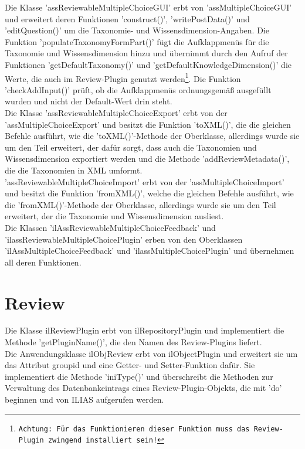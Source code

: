 \documentclass[a4paper]{scrreprt}
\begin{document}
Die Klasse 'assReviewableMultipleChoiceGUI' erbt von 'assMultipleChoiceGUI' und erweitert deren Funktionen '\textunderscore \textunderscore construct()', 'writePostData()' und 'editQuestion()' um die Taxonomie- und Wissensdimension-Angaben. 
Die Funktion 'populateTaxonomyFormPart()' fügt die Aufklappmenüs für die Taxonomie und Wissensdimension hinzu und übernimmt durch den Aufruf der Funktionen 'getDefaultTaxonomy()' und 'getDefaultKnowledgeDimension()' die Werte, die auch im Review-Plugin genutzt werden\footnote{\texttt{Achtung: Für das Funktionieren dieser Funktion muss das Review-Plugin zwingend installiert sein!}}. 
Die Funktion 'checkAddInput()' prüft, ob die Aufklappmenüs ordnungsgemäß ausgefüllt wurden und nicht der Default-Wert drin steht. \\

Die Klasse 'assReviewableMultipleChoiceExport' erbt von der 'assMultipleChoiceExport' und besitzt die Funktion 'toXML()', die die gleichen Befehle ausführt, wie die 'toXML()'-Methode der Oberklasse, allerdings wurde sie um den Teil erweitert, der dafür sorgt, dass auch die Taxonomien und Wissensdimension exportiert werden und die Methode 'addReviewMetadata()', die die Taxonomien in XML umformt.\\

'assReviewableMultipleChoiceImport' erbt von der 'assMultipleChoiceImport' und besitzt die Funktion 'fromXML()', welche die gleichen Befehle ausführt, wie die 'fromXML()'-Methode der Oberklasse, allerdings wurde sie um den Teil erweitert, der die Taxonomie und Wissensdimension ausliest.\\

Die Klassen 'ilAssReviewableMultipleChoiceFeedback' und 'ilassReviewableMultipleChoicePlugin' erben von den Oberklassen 'ilAssMultipleChoiceFeedback' und 'ilassMultipleChoicePlugin' und übernehmen all deren Funktionen.\\

\section{Review}

Die Klasse ilReviewPlugin erbt von ilRepositoryPlugin und implementiert die Methode 'getPluginName()', die den Namen des Review-Plugins liefert.\\

Die Anwendungsklasse ilObjReview erbt von ilObjectPlugin und erweitert sie um das Attribut group\textunderscore id und eine Getter- und Setter-Funktion dafür. 
Sie implementiert die Methode 'iniType()' und überschreibt die Methoden zur Verwaltung des Datenbankeintrags eines Review-Plugin-Objekts, die mit 'do' beginnen und von ILIAS aufgerufen werden.
\end{document}
